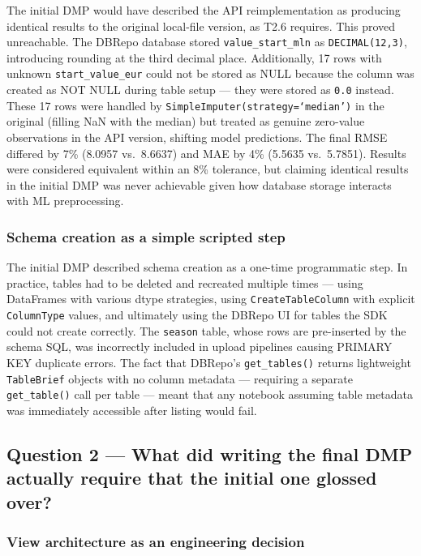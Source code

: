 The initial DMP would have described the API reimplementation as producing identical
results to the original local-file version, as T2.6 requires. This proved unreachable.
The DBRepo database stored \texttt{value\_start\_mln} as \texttt{DECIMAL(12,3)},
introducing rounding at the third decimal place. Additionally, 17 rows with unknown
\texttt{start\_value\_eur} could not be stored as NULL because the column was created
as NOT NULL during table setup --- they were stored as \texttt{0.0} instead. These 17
rows were handled by \texttt{SimpleImputer(strategy=`median')} in the original (filling
NaN with the median) but treated as genuine zero-value observations in the API version,
shifting model predictions. The final RMSE differed by 7\% (8.0957 vs.\ 8.6637) and
MAE by 4\% (5.5635 vs.\ 5.7851). Results were considered equivalent within an 8\%
tolerance, but claiming identical results in the initial DMP was never achievable given
how database storage interacts with ML preprocessing.

\subsubsection*{Schema creation as a simple scripted step}

The initial DMP described schema creation as a one-time programmatic step. In practice,
tables had to be deleted and recreated multiple times --- using DataFrames with various
dtype strategies, using \texttt{CreateTableColumn} with explicit \texttt{ColumnType}
values, and ultimately using the DBRepo UI for tables the SDK could not create
correctly. The \texttt{season} table, whose rows are pre-inserted by the schema SQL,
was incorrectly included in upload pipelines causing PRIMARY KEY duplicate errors. The
fact that DBRepo's \texttt{get\_tables()} returns lightweight \texttt{TableBrief}
objects with no column metadata --- requiring a separate \texttt{get\_table()} call per
table --- meant that any notebook assuming table metadata was immediately accessible
after listing would fail.

\bigskip

\subsection*{Question 2 — What did writing the final DMP actually require that the initial one glossed over?}

\subsubsection*{View architecture as an engineering decision}

